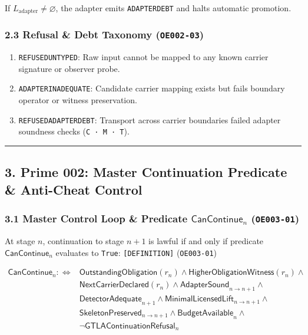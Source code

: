 \documentclass[
  11pt,
]{article}
\providecommand{\tightlist}{%
  \setlength{\itemsep}{0pt}\setlength{\parskip}{0pt}}
\renewcommand{\_}{\origunderscore\allowbreak}
\begin{document}
If \(L_{\text{adapter}} \neq \varnothing\), the adapter emits
\texttt{ADAPTER\_DEBT} and halts automatic promotion.

\subsubsection{\texorpdfstring{2.3 Refusal \& Debt Taxonomy
(\texttt{OE002-03})}{2.3 Refusal \& Debt Taxonomy (OE002-03)}}\label{refusal-debt-taxonomy-oe002-03}

\begin{enumerate}
\def\labelenumi{\arabic{enumi}.}
\tightlist
\item
  \texttt{REFUSED\_UNTYPED}: Raw input cannot be mapped to any known
  carrier signature or observer probe.
\item
  \texttt{ADAPTER\_INADEQUATE}: Candidate carrier mapping exists but
  fails boundary operator or witness preservation.
\item
  \texttt{REFUSED\_ADAPTER\_DEBT}: Transport across carrier boundaries
  failed adapter soundness checks (\texttt{C\ ·\ M\ ·\ T}).
\end{enumerate}

\begin{center}\rule{0.5\linewidth}{0.5pt}\end{center}

\subsection{3. Prime 002: Master Continuation Predicate \& Anti-Cheat
Control}\label{prime-002-master-continuation-predicate-anti-cheat-control}

\subsubsection{\texorpdfstring{3.1 Master Control Loop \& Predicate
\(\mathsf{CanContinue}_n\)
(\texttt{OE003-01})}{3.1 Master Control Loop \& Predicate \textbackslash mathsf\{CanContinue\}\_n (OE003-01)}}\label{master-control-loop-predicate-mathsfcancontinue_n-oe003-01}

At stage \(n\), continuation to stage \(n+1\) is lawful if and only if
predicate \(\mathsf{CanContinue}_n\) evaluates to \texttt{True}:
\texttt{{[}DEFINITION{]}} (\texttt{OE003-01})

\[\begin{aligned}
\mathsf{CanContinue}_n :\iff &\mathsf{OutstandingObligation}(r_n) \wedge \mathsf{HigherObligationWitness}(r_n) \wedge \\
&\mathsf{NextCarrierDeclared}(r_n) \wedge \mathsf{AdapterSound}_{n\to n+1} \wedge \\
&\mathsf{DetectorAdequate}_{n+1} \wedge \mathsf{MinimalLicensedLift}_{n\to n+1} \wedge \\
&\mathsf{SkeletonPreserved}_{n\to n+1} \wedge \mathsf{BudgetAvailable}_n \wedge \\
&\neg\mathsf{GTLAContinuationRefusal}_n
\end{aligned}\]
\end{document}
